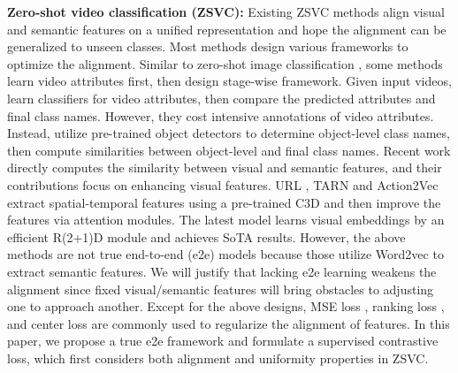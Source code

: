 \documentclass[10pt,twocolumn,letterpaper]{article}
\begin{document}
{\bf Zero-shot video classification (ZSVC):}
Existing ZSVC methods align visual and semantic features on a unified representation and hope the alignment can be generalized to unseen classes.
Most methods design various frameworks to optimize the alignment.
Similar to zero-shot image classification \cite{xian2018zero}, some methods \cite{liu2011recognizing,gan2016learning,jain2015objects2action,mettes2021object,kim2021daszl} learn video attributes first, then design stage-wise framework.
Given input videos, \cite{liu2011recognizing,gan2016learning} learn classifiers for video attributes, then compare the predicted attributes and final class names.
However, they cost intensive annotations of video attributes.
Instead, \cite{jain2015objects2action,mettes2021object,kim2021daszl} utilize pre-trained object detectors to determine object-level class names, then compute similarities between object-level and final class names. 
Recent work directly computes the similarity between visual and semantic features, and their contributions focus on enhancing visual features.
URL \cite{zhu2018towards}, TARN \cite{bishay2019tarn} and Action2Vec \cite{hahn2019action2vec} extract spatial-temporal features using a pre-trained C3D and then improve the features via attention modules.
The latest model \cite{brattoli2020rethinking} learns visual embeddings by an efficient R(2+1)D module and achieves SoTA results.
However, the above methods are not true end-to-end (e2e) models because those utilize Word2vec \cite{mikolov2013efficient} to extract semantic features.
We will justify that lacking e2e learning weakens the alignment since fixed visual/semantic features will bring obstacles to adjusting one to approach another.
Except for the above designs, MSE loss \cite{brattoli2020rethinking}, ranking loss \cite{hahn2019action2vec}, and center loss \cite{gao2020learning} are commonly used to regularize the alignment of features.
In this paper, we propose a true e2e framework and formulate a supervised contrastive loss, which first considers both alignment and uniformity properties in ZSVC.
\end{document}
